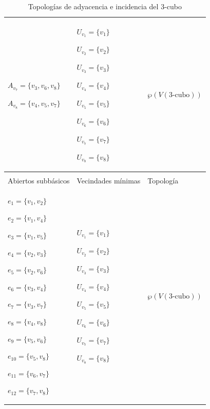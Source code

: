 \begin{table}[p]
\begin{tabular}{@{}>{\centering\arraybackslash}m{}>{\centering\arraybackslash}m{}>{\centering\arraybackslash}m{}@{}}
         ${A_{v_7}=\{v_3,v_6,v_8\}}$\par
         ${A_{v_8}=\{v_4,v_5,v_7\}}$
      &
         ${U_{v_1}=\{v_1\}}$\par
         ${U_{v_2}=\{v_2\}}$\par
         ${U_{v_3}=\{v_3\}}$\par
         ${U_{v_4}=\{v_4\}}$\par
         ${U_{v_5}=\{v_5\}}$\par
         ${U_{v_6}=\{v_6\}}$\par
         ${U_{v_7}=\{v_7\}}$\par
         ${U_{v_8}=\{v_8\}}$
      &
         $\wp\left(V\left(\text{3-cubo}\right)\right)$ \\[6pt]
      \hline
      \multicolumn{3}{c}{\textbf{Topología de incidencia}} \\
      \hline
      Abiertos subbásicos & Vecindades mínimas & Topología \\
      \hline
         ${e_{1}=\{v_1,v_2\}}$\par
         ${e_{2}=\{v_1,v_4\}}$\par
         ${e_{3}=\{v_1,v_5\}}$\par
         ${e_{4}=\{v_2,v_3\}}$\par
         ${e_{5}=\{v_2,v_6\}}$\par
         ${e_{6}=\{v_3,v_4\}}$\par
         ${e_{7}=\{v_3,v_7\}}$\par
         ${e_{8}=\{v_4,v_8\}}$\par
         ${e_{9}=\{v_5,v_6\}}$\par
         ${e_{10}=\{v_5,v_8\}}$\par
         ${e_{11}=\{v_6,v_7\}}$\par
         ${e_{12}=\{v_7,v_8\}}$
      &
         ${U_{v_1}=\{v_1\}}$\par
         ${U_{v_2}=\{v_2\}}$\par
         ${U_{v_3}=\{v_3\}}$\par
         ${U_{v_4}=\{v_4\}}$\par
         ${U_{v_5}=\{v_5\}}$\par
         ${U_{v_6}=\{v_6\}}$\par
         ${U_{v_7}=\{v_7\}}$\par
         ${U_{v_8}=\{v_8\}}$
      &
         $\wp\left(V\left(\text{3-cubo}\right)\right)$ \\[6pt]
      \hline
   \end{tabular}
   \caption{Topologías de adyacencia e incidencia del 3-cubo}
   \label{tab:topologias_3_cubo}
\end{table}
